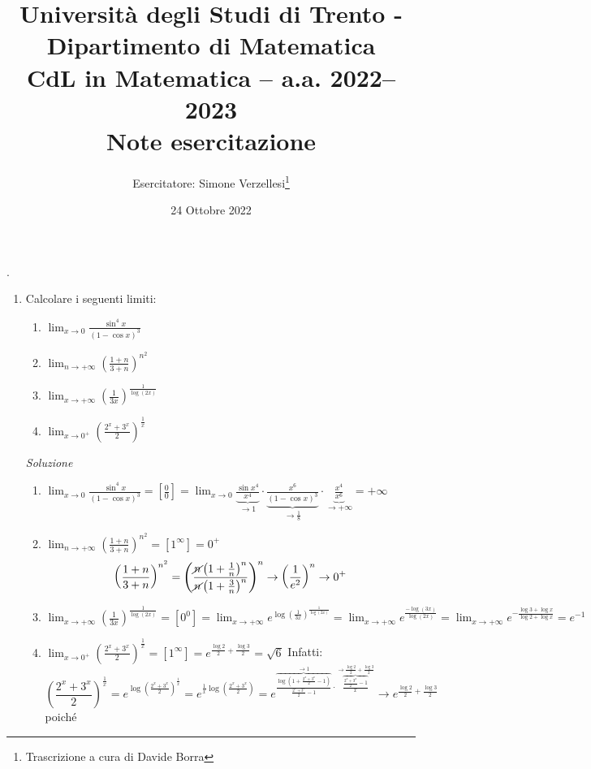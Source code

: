 \documentclass{article}
\title{Università degli Studi di Trento - Dipartimento di Matematica\\
CdL in Matematica – a.a. 2022–2023\\ Note esercitazione}
\author{Esercitatore: Simone Verzellesi\thanks{Trascrizione a cura di Davide Borra}}
\date{24 Ottobre 2022}
\begin{document}
\maketitle
{}
\setlength{\headheight}{30pt}.
\begin{enumerate}[label=\textbf{Esercizio 6.\arabic*.},itemindent=*]
    \item Calcolare i seguenti limiti:
    \begin{enumerate}
        \item $\lim_{x\to0}\frac{\sin^4 x}{(1-\cos x)^3}$
        \item $\lim_{n\to+\infty}\left( \frac{1+n}{3+n} \right)^{n^2}$
        \item $\lim_{x\to+\infty}\left( \frac{1}{3x} \right)^{\frac{1}{\log(2x)}}$
        \item $\lim_{x\to0^+}\left( \frac{2^x+3^x}{2} \right)^\frac{1}{x}$
    \end{enumerate}
    \item[\textit{\large Soluzione~}]~
    \begin{enumerate}
        \item $\lim_{x\to0}\frac{\sin^4 x}{(1-\cos x)^3}=\left[ \frac{0}{0} \right]=\lim_{x\to 0}\underbrace{\frac{\sin x^4}{x^4}}_{\to 1}\cdot \underbrace{\frac{x^6}{(1-\cos x)^3}}_{\to \frac{1}{8}}\cdot \underbrace{\frac{x^4}{x^6}}_{\to +\infty}=+\infty$
        \item $\lim_{n\to+\infty}\left( \frac{1+n}{3+n} \right)^{n^2}=\left[ 1^\infty\right]=0^+$
        \[\left(\frac{1+n}{3+n}\right)^{n^2}=\left(\frac{\cancel{n}\left( 1+\frac{1}{n} \right)^n}{\cancel{n}\left( 1+\frac{3}{n} \right)^n}\right)^{n}\to \left( \frac{1}{e^2} \right)^n\to 0^+\]
        \item $\lim_{x\to+\infty}\left( \frac{1}{3x} \right)^{\frac{1}{\log(2x)}}=\left[ {0}^{0} \right]=\lim_{x\to+\infty}e^{\log\left( \frac{1}{3x} \right)^{\frac{1}{\log(2x)}}}=\lim_{x\to+\infty}e^{\frac{-\log(3x)}{\log(2x)}}=\lim_{x\to+\infty}e^{-\frac{\log 3+\log x}{\log 2+\log x}}=e^{-1}$
        \item $\lim_{x\to0^+}\left( \frac{2^x+3^x}{2} \right)^\frac{1}{x}=\left[ 1^\infty\right]=e^{\frac{\log2}{2}+\frac{\log3}{2}}=\sqrt{6}$ Infatti:
        \[\left( \frac{2^x+3^x}{2} \right)^\frac{1}{x}=e^{\log\left( \frac{2^x+3^x}{2} \right)^\frac{1}{x}}=e^{\frac{1}{x}\log\left( \frac{2^x+3^x}{2} \right)}=e^{\overbrace{\frac{\log\left( 1+\frac{2^x+3^x}{2}-1 \right)}{\frac{2^x+3^x}{2}-1}}^{\to1}\cdot\overbrace{\frac{\frac{2^x+3^x}{2}-1}{x}}^{\to\frac{\log2}{2}+\frac{\log3}{2}}}\to e^{\frac{\log2}{2}+\frac{\log3}{2}}\]poiché

\end{enumerate}
\end{enumerate}
\end{document}
